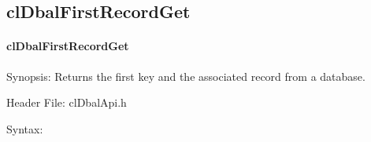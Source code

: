 \begin{flushleft}
\subsection{clDbalFirstRecordGet}
\hypertarget{pagedbal109}{}\paragraph{cl\-Dbal\-First\-Record\-Get}\label{pagedbal109}
\begin{Desc}
\item[Synopsis:]Returns the first key and the associated record from a database.\end{Desc}
\begin{Desc}
\item[Header File:]clDbalApi.h\end{Desc}
\begin{Desc}
\item[Syntax:]


\end{Desc}
\end{flushleft}
